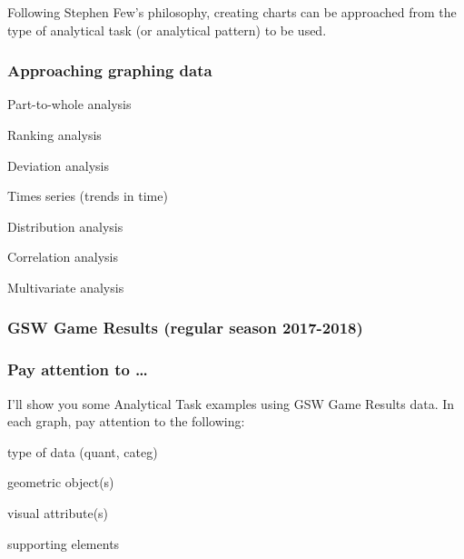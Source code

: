 \documentclass[12pt]{beamer}\usepackage[]{graphicx}\usepackage[]{color}
\begin{document}

\begin{frame}
\begin{center}
\Huge{}
\end{center}
\end{frame}


\begin{frame}
\frametitle{}

\Large Following Stephen Few's philosophy, creating charts can be approached from the type of analytical task (or analytical pattern) to be used.

\end{frame}


\begin{frame}
\frametitle{Approaching graphing data}

\bi
  \item Part-to-whole analysis
  \item Ranking analysis
  \item Deviation analysis
  \item Times series (trends in time)
  \item Distribution analysis
  \item Correlation analysis
  \item Multivariate analysis
\ei

\end{frame}


\begin{frame}
\frametitle{GSW Game Results (regular season 2017-2018)}
\begin{center}
\end{center}
\end{frame}


\begin{frame}
\frametitle{Pay attention to \dots}

I'll show you some Analytical Task examples using GSW Game Results data. In each graph, pay attention to the following:

\bbi
  \item type of data (quant, categ)
  \item geometric object(s)
  \item visual attribute(s)
  \item supporting elements
\ei



\end{frame}
\end{document}
